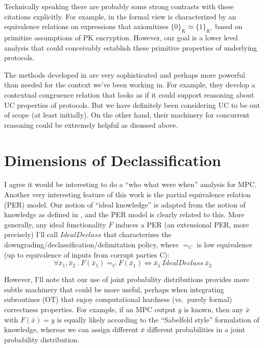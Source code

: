 \documentclass[acmsmall,screen,review]{acmart}
\begin{document}
Technically speaking there are probably some strong contrasts with
these citations explicitly. For example,
in \cite{10.1007/3-540-44929-9_1} the formal view is characterized by
an equivalence relations on expressions that axiomitizes $\{
0 \}_K \simeq \{ 1 \}_{K'}$ based on primitize assumptions of PK
encryption. However, our goal is a lower level analysis that could
conceivably establish these primitive properties of underlying
protocols.

The methods developed in \cite{10.1007/3-540-44929-9_1} are very
sophisticated and perhaps more powerful than needed for the context
we've been working in. For example, they develop a contextual
congruence relation that looks as if it could support reasoning
about UC properties of protocols. But we have definitely been
considering UC to be out of scope (at least initially). On the
other hand, their machinery for concurrent reasoning could be
extremely helpful as disussed above.

\section{Dimensions of Declassification}

I agree it would be interesting to do a ``who what were when''
analysis for MPC. Another very interesting feature of this work
is the partial equivalence relation (PER) model.  Our notion of
``ideal knowledge'' is adapted from the notion of knowledge as defined
in \cite{10.1007/978-3-540-37621-7_9}, and the PER model is clearly
related to this. More generally, any ideal functionality $F$ induces a
PER (an extensional PER, more precisely) I'll call $\mathit{IdealDeclass}$
that characterizes the downgrading/declassification/delimitation policy,
where $=_C$ is low equivalence (up to equivalence of inputs from corrupt
parties C):
$$
\forall \bar{x}_1,\bar{x}_2\ .\ F(\bar{x}_1) =_C F(\bar{x}_1) \iff \bar{x}_1
\ \mathit{IdealDeclass}\ \bar{x}_2  
$$

However, I'll note that our use of joint probability distributions
provides more subtle machinery that could be more useful, perhaps
when integrating subroutines (OT) that enjoy computational hardness
(vs.~purely formal) correctness properties. For example, if an
MPC output $y$ is known, then any $\bar{x}$ with $F(\bar{x}) = y$
is equally likely according to the ``Sabelfeld style'' formulation
of knowledge, whereas we can assign different $\bar{x}$ different
probabilities in a joint probability distribution.
\end{document}
